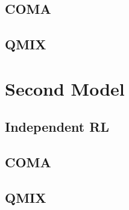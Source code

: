 
\subsection{COMA}
\subsection{QMIX}

\section{Second Model}
\subsection{Independent RL}
\subsection{COMA}
\subsection{QMIX}